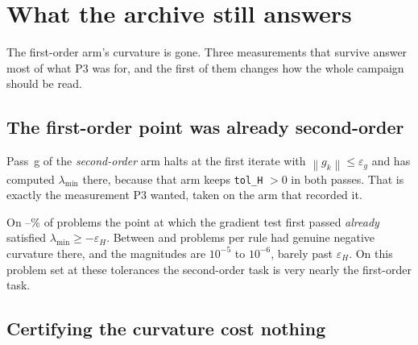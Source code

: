 \documentclass[11pt,a4paper]{article}
\providecommand{\norm}[1]{\left \lVert #1 \right \rVert}
\theoremstyle{remark}
\begin{document}
\section{What the archive still answers}\label{sec: salvage}

The first-order arm's curvature is gone. Three measurements that survive answer
most of what P3 was for, and the first of them changes how the whole campaign
should be read.

\subsection{The first-order point was already second-order}\label{sec: already}

Pass~g of the \emph{second-order} arm halts at the first iterate with
$\norm{g_k} \leq \varepsilon_g$ and has computed $\lambda_{\min}$ there, because
that arm keeps \texttt{tol\_H} $> 0$ in both passes. That is exactly the
measurement P3 wanted, taken on the arm that recorded it.

\begin{table}[H]
  \centering
  \caption{Curvature at the first-order point. Second-order arm, pass~g,
    $n \leq \NMaxExact{}$, so $\lambda_{\min}$ is a dense eigendecomposition of
    $\nabla^2 f(x)$ and exact.}
  \label{tab: curv}
  
\end{table}

On \CurvAlreadyMin--\CurvAlreadyMax\% of problems the point at which the gradient
test first passed \emph{already} satisfied $\lambda_{\min} \geq -\varepsilon_H$.
Between \CurvNegMin{} and \CurvNegMax{} problems per rule had genuine negative
curvature there, and the magnitudes are $10^{-5}$ to $10^{-6}$, barely past
$\varepsilon_H$. On this problem set at these tolerances the second-order task is
very nearly the first-order task.

\subsection{Certifying the curvature cost nothing}\label{sec: extra}

\begin{table}[H]
  \centering
  \caption{Cost of pass~h relative to pass~g within the second-order arm, median
    over the problems on which both met their criterion, $n \leq \NMaxExact{}$.}
  \label{tab: extra}
  
\end{table}
\end{document}
